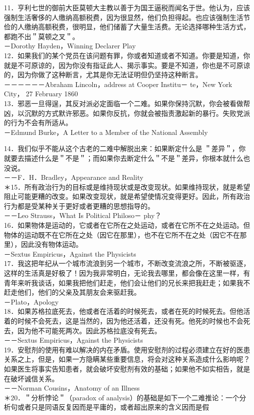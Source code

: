 11．亨利七世的御前大臣莫顿大主教以善于为国王逼税而闻名于世。他认为，应该强制生活奢侈的人缴纳高额税费，因为很显然，他们负担得起。也应该强制生活节俭的人缴纳高额税费，很明显，他们储蓄了大量生活费。无论选择哪种生活方式，都跑不出＂莫顿之叉＂。\\
－Dorothy Hayden，Winning Declarer Play\\
12．如果我们的某个党员在该问题有罪，你或者知道或者不知道。你要是知道，你就是不可原谅的，因为你没有指证此人、揭示事实。要是不知道，你也是不可原谅的，因为你做了这种断言，尤其是你无法证明但仍坚持这种断言。\\
－－－－－－Abraham Lincoln，address at Cooper Institu－ te，New York City， 27 February 1860\\
13．邪恶一旦得逞，其反对派必定面临一个二难。如果你保持沉默，你会被看做帮凶，以沉默的方式默许邪恶。如果你反抗，你就会被指责激起新的暴行。失败党派的行为不会有所适从。\\
－Edmund Burke，A Letter to a Member of the National Assembly

14．我们似乎不能从这个古老的二难中解脱出来：如果断定什么是 ＂差异＂，你就要去描述什么是＂不是＂；而如果你去断定什么＂不是＂差异，你根本就什么也没说。\\
－－F．H．Bradley，Appearance and Reality\\
＊15．所有政治行为的目标或是维持现状或是改变现状。如果维持现状，就是希望阻止可能更糟的改变。如果改变现状，就是希望使情况变得更好。因此，所有政治行为都是受某种关于更好或者更糟的思想指导的。\\
－－Leo Strauss，What Is Political Philoso－ phy？\\
16．如果物体是运动的，它或者在它所在之处运动，或者在它所不在之处运动。但物体的运动既不在它所在之处（因它在那里），也不在它所不在之处（因它不在那里），因此没有物体运动。\\
－Sextus Empiricus，Against the Physicists\\
17．我这把年纪从一个城市流浪到另一个城市，不断改变流浪之所，不断被驱逐，这样的生活真是好极了！因为我非常明白，无论我去哪里，都会像在这里一样，有青年来听我谈话，如果我把他们赶走，他们会让他们的兄长来把我赶走；如果我不赶走他们，他们的父亲及其朋友会来驱赶我。\\
－Plato，Apology\\
18．如果苏格拉底死去，他或者在活着的时候死去，或者在死的时候死去。但他活着的时候不会死去，这是当然的，因为他还活着，还没有死。他死的时候也不会死去，因为他不可能死两次。因此苏格拉底没有死去。\\
－－Sextus Empiricus，Against the Physicists\\
19．安慰剂的使用有难以解决的内在矛盾。使用安慰剂的过程必须建立在好的医患关系之上，但是，如果一方隐瞒某些重要信息，将会对这种关系造成什么影响呢？如果医生将事实告知患者，就会破坏安慰剂有效的基础；如果他不如实相告，就是在破坏诚信关系。\\
－－Norman Cousins，Anatomy of an Illness\\
＊20．＂分析悖论＂（paradox of analysis）的基础是如下一个二难推论：一个分析句或者只是同语反复因而是平庸的，或者超出原来的含义因而是假

